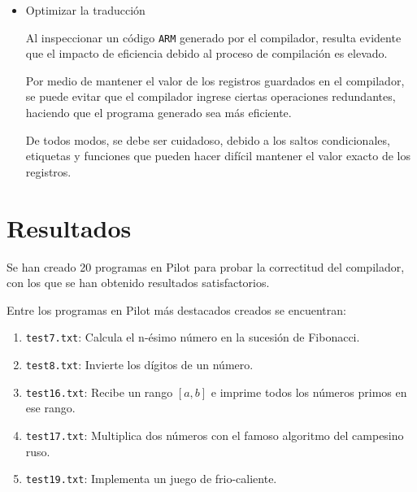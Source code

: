 \documentclass[12pt,spanish]{article}
\begin{document}
\begin{itemize}

\item{Optimizar la traducción}

Al inspeccionar un código \texttt{ARM} generado por el compilador, resulta evidente que el impacto de eficiencia debido al proceso de compilación es elevado.

Por medio de mantener el valor de los registros guardados en el compilador, se puede evitar que el compilador ingrese ciertas operaciones redundantes, haciendo que el programa generado sea más eficiente.

De todos modos, se debe ser cuidadoso, debido a los saltos condicionales, etiquetas y funciones que pueden hacer difícil mantener el valor exacto de los registros.

\end{itemize}

\section{Resultados}
Se han creado 20 programas en Pilot para probar la correctitud del compilador, con los que se han obtenido resultados satisfactorios.

\noindent
Entre los programas en Pilot más destacados creados se encuentran:
\begin{enumerate}
\item{\texttt{test7.txt}: Calcula el n-ésimo número en la sucesión de Fibonacci.}
\item{\texttt{test8.txt}: Invierte los dígitos de un número.}
\item{\texttt{test16.txt}: Recibe un rango $[a, b]$ e imprime todos los números primos en ese rango.}
\item{\texttt{test17.txt}: Multiplica dos números con el famoso algoritmo del campesino ruso.}
\item{\texttt{test19.txt}: Implementa un juego de frio-caliente.}
\end{enumerate}
 
\end{document}
